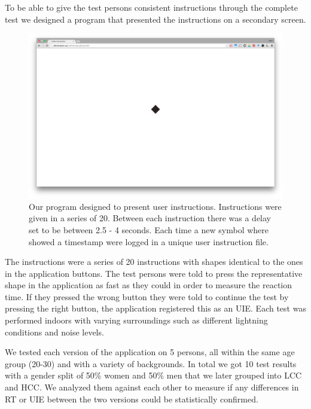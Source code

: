 \documentclass[runningheads,a4paper]{llncs}
\begin{document}
To be able to give the test persons consistent instructions through the complete test we designed a program that presented the instructions on a secondary screen. 
\begin{figure}
	\centering
	\includegraphics[width=\textwidth]{instructions}
	\caption{Our program designed to present user instructions. Instructions were given in a series of 20. Between each instruction there was a delay set to be between 2.5 - 4 seconds. Each time a new symbol where showed a timestamp were logged in a unique user instruction file.
	\label{fig:instructions}}
\end{figure}
The instructions were a series of 20 instructions with shapes identical to the ones in the application buttons. The test persons were told to press the representative shape in the application as fast as they could in order to measure the reaction time. If they pressed the wrong button they were told to continue the test by pressing the right button, the application registered this as an UIE. Each test was performed indoors with varying surroundings such as different lightning conditions and noise levels. 

We tested each version of the application on 5 persons, all within the same age group (20-30) and with a variety of backgrounds. In total we got 10 test results with a gender split of 50\% women and 50\% men that we later grouped into LCC and HCC. We analyzed them against each other to measure if any differences in RT or UIE between the two versions could be statistically confirmed.
\end{document}
